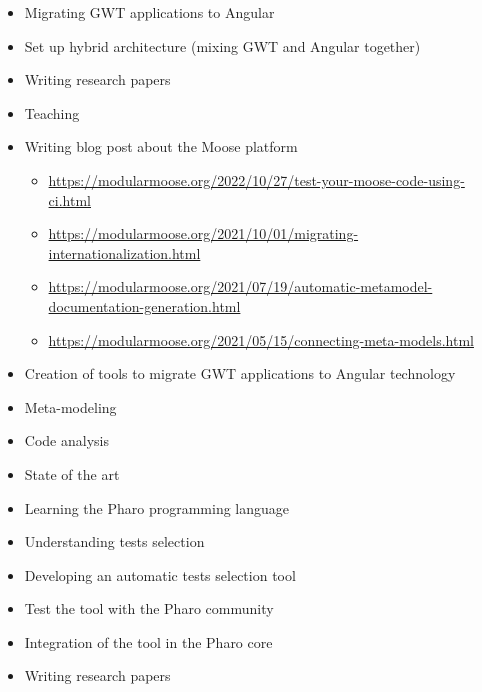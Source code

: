 \documentclass[10pt,a4paper,ragged2e,withhyper]{altacv}
\begin{document}
\divider


\begin{itemize}
  \item Migrating GWT applications to Angular
  \item Set up hybrid architecture (mixing GWT and Angular together)
  \item Writing research papers
  \item Teaching
  \item Writing blog post about the Moose platform
  \begin{itemize}
    \item \url{https://modularmoose.org/2022/10/27/test-your-moose-code-using-ci.html}
    \item \url{https://modularmoose.org/2021/10/01/migrating-internationalization.html}
    \item \url{https://modularmoose.org/2021/07/19/automatic-metamodel-documentation-generation.html}
    \item \url{https://modularmoose.org/2021/05/15/connecting-meta-models.html}
  \end{itemize}
\end{itemize}

\divider


\begin{itemize}
  \item Creation of tools to migrate GWT applications to Angular technology
  \item Meta-modeling
  \item Code analysis
  \item State of the art
\end{itemize}

\divider


\begin{itemize}
  \item Learning the Pharo programming language
  \item Understanding tests selection
  \item Developing an automatic tests selection tool
  \item Test the tool with the Pharo community
  \item Integration of the tool in the Pharo core
  \item Writing research papers
\end{itemize}
\end{document}
